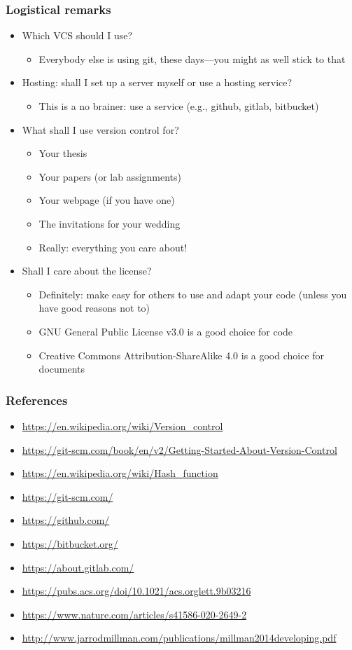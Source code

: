 \documentclass[9pt]{beamer}
\begin{document}
\begin{frame}
  \frametitle{Logistical remarks}
  \begin{itemize}
  \item Which VCS should I use?
    \begin{itemize}
    \item Everybody else is using git, these days---you might as well stick
      to that
    \end{itemize}
  \item Hosting: shall I set up a server myself or use a hosting service?
    \begin{itemize}
    \item This is a no brainer: use a service (e.g., github, gitlab, bitbucket)
    \end{itemize}
  \item What shall I use version control for?
    \begin{itemize}
    \item Your thesis
    \item Your papers (or lab assignments)
    \item Your webpage (if you have one)
    \item The invitations for your wedding
    \item Really: everything you care about!
    \end{itemize}
  \item Shall I care about the license?
    \begin{itemize}
    \item Definitely: make easy for others to use and adapt your code
      (unless you have good reasons not to)
    \item GNU General Public License v3.0 is a good choice for code
    \item Creative Commons Attribution-ShareAlike 4.0 is a good choice for
      documents
    \end{itemize}
  \end{itemize}
\end{frame}


\begin{frame}
  \frametitle{References}
  \scriptsize
  \begin{itemize}
  \item \url{https://en.wikipedia.org/wiki/Version_control}
  \item \url{https://git-scm.com/book/en/v2/Getting-Started-About-Version-Control}
  \item \url{https://en.wikipedia.org/wiki/Hash_function}
  \item \url{https://git-scm.com/}
  \item \url{https://github.com/}
  \item \url{https://bitbucket.org/}
  \item \url{https://about.gitlab.com/}
  \item \url{https://pubs.acs.org/doi/10.1021/acs.orglett.9b03216}
  \item \url{https://www.nature.com/articles/s41586-020-2649-2}
  \item \url{http://www.jarrodmillman.com/publications/millman2014developing.pdf}
  \end{itemize}
\end{frame}
\end{document}
